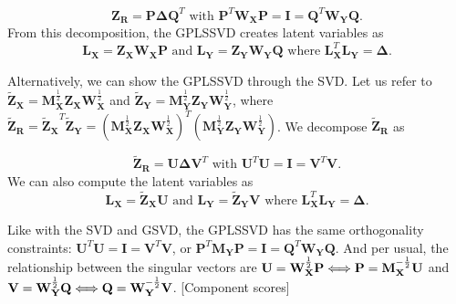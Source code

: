 \documentclass[12pt]{article}
\begin{document}
\begin{equation}
{\mathbf Z}_{\mathbf R} = {\mathbf P} {\boldsymbol \Delta} {\mathbf Q}^{T}
\textrm{ with }
{\mathbf P}^{T}{\mathbf W}_{\mathbf X}{\mathbf P} = {\mathbf I} =
{\mathbf Q}^{T}{\mathbf W}_{\mathbf Y}{\mathbf Q}.
\end{equation} From this decomposition, the GPLSSVD creates latent
variables as \begin{equation}
{\mathbf L}_{\mathbf X} 
= {\mathbf Z}_{\mathbf X}{\mathbf W}_{\mathbf X}{\mathbf P} 
\textrm{ and } 
{\mathbf L}_{\mathbf Y} = 
{\mathbf Z}_{\mathbf Y}{\mathbf W}_{\mathbf Y}{\mathbf Q}
\textrm{ where }
{\mathbf L}_{\mathbf X}^{T} {\mathbf L}_{\mathbf Y} 
= {\boldsymbol \Delta}. 
\end{equation}

Alternatively, we can show the GPLSSVD through the SVD. Let us refer to
\({\widetilde{\mathbf Z}_{\mathbf X}} = {\mathbf M}_{\mathbf X}^{\frac{1}{2}}{\mathbf Z}_{\mathbf X}{\mathbf W}_{\mathbf X}^{\frac{1}{2}}\)
and
\({\widetilde{\mathbf Z}_{\mathbf Y}} = {\mathbf M}_{\mathbf Y}^{\frac{1}{2}}{\mathbf Z}_{\mathbf Y}{\mathbf W}_{\mathbf Y}^{\frac{1}{2}}\),
where
\(\widetilde{\mathbf Z}_{\mathbf R} = {\widetilde{\mathbf Z}_{\mathbf X}}^{T}{\widetilde{\mathbf Z}_{\mathbf Y}} = ({\mathbf M}_{\mathbf X}^{\frac{1}{2}}{\mathbf Z}_{\mathbf X}{\mathbf W}_{\mathbf X}^{\frac{1}{2}})^{T}({\mathbf M}_{\mathbf Y}^{\frac{1}{2}}{\mathbf Z}_{\mathbf Y}{\mathbf W}_{\mathbf Y}^{\frac{1}{2}})\).
We decompose \(\widetilde{\mathbf Z}_{\mathbf R}\) as

\begin{equation}
\widetilde{\mathbf Z}_{\mathbf R} = {\mathbf U} {\boldsymbol \Delta} {\mathbf V}^{T}
\textrm{ with }
{\mathbf U}^{T}{\mathbf U} = {\mathbf I} =
{\mathbf V}^{T}{\mathbf V}.
\end{equation} We can also compute the latent variables as
\begin{equation}
{\mathbf L}_{\mathbf X} 
= \widetilde{\mathbf Z}_{\mathbf X}{\mathbf U} 
\textrm{ and } 
{\mathbf L}_{\mathbf Y} = 
\widetilde{\mathbf Z}_{\mathbf Y}{\mathbf V}
\textrm{ where }
{\mathbf L}_{\mathbf X}^{T} {\mathbf L}_{\mathbf Y} 
= {\boldsymbol \Delta}. 
\end{equation}

Like with the SVD and GSVD, the GPLSSVD has the same orthogonality
constraints:
\({\mathbf U}^{T}{\mathbf U} = {\mathbf I} = {\mathbf V}^{T}{\mathbf V}\),
or
\({\mathbf P}^{T}{\mathbf M}_{\mathbf Y}{\mathbf P} = {\mathbf I} = {\mathbf Q}^{T}{\mathbf W}_{\mathbf Y}{\mathbf Q}\).
And per usual, the relationship between the singular vectors are
\({\mathbf U} = {\mathbf W}_{\bf X}^{\frac{1}{2}}{\mathbf P} \Longleftrightarrow {\mathbf P} = {\mathbf M}_{\bf X}^{-\frac{1}{2}}{\mathbf U}\)
and
\({\mathbf V} = {\mathbf W}_{\bf Y}^{\frac{1}{2}}{\mathbf Q} \Longleftrightarrow {\mathbf Q} = {\mathbf W}_{\bf Y}^{-\frac{1}{2}}{\mathbf V}\).
{[}Component scores{]}
\end{document}
